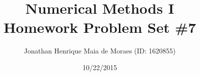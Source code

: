 \title{Numerical Methods I \\ Homework Problem Set \#7}
\author{Jonathan Henrique Maia de Moraes (ID: 1620855)}
\date{10/22/2015}
\maketitle